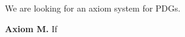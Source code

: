 \documentclass{article}
\begin{document}
    We are looking for an axiom system for PDGs. 
    
    \textbf{Axiom M.} If 
\end{document}
